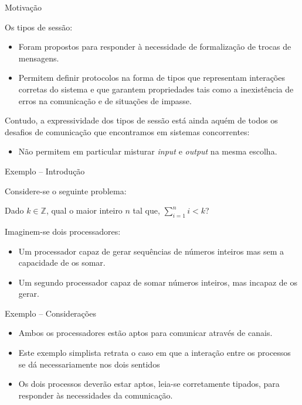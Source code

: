 \lstset{language=freest, numbers=none, escapeinside=||}

\begin{frame}[fragile]{Motivação}

  Os tipos de sessão:
  \begin{itemize}
  \item Foram propostos para responder à necessidade de formalização de trocas de mensagens.
  \item Permitem definir protocolos na forma de tipos que representam interações corretas do sistema e que garantem propriedades tais como a inexistência de erros na comunicação e de situações de impasse.
  \end{itemize}
  Contudo, a expressividade dos tipos de sessão está ainda aquém de todos os desafios de comunicação que encontramos em sistemas concorrentes:
  \begin{itemize}
  \item Não permitem em particular misturar \textit{input} e \textit{output} na mesma escolha.
  \end{itemize}
\end{frame}

\begin{frame}[fragile]{Exemplo -- Introdução}

  Considere-se o seguinte problema:
  
  Dado $k \in \mathbb{Z}$, qual o maior inteiro $n$ tal que, $\sum_{i=1}^{n} i < k$?

  Imaginem-se dois processadores:
  \begin{itemize}
  \item Um processador capaz de gerar sequências de números inteiros mas sem a capacidade de os somar.
  \item Um segundo processador capaz de somar números inteiros, mas incapaz de os gerar.
  \end{itemize}  
\end{frame}

\begin{frame}{Exemplo -- Considerações}
  \begin{itemize}
  \item Ambos os processadores estão aptos para comunicar através de canais.
    \vspace*{2mm}
  \item Este exemplo simplista retrata o caso em que a interação entre os processos se dá necessariamente nos dois sentidos
    \vspace*{5mm}
  \item Os dois processos deverão estar aptos, leia-se corretamente tipados, para responder às necessidades da comunicação.
  \end{itemize}
\end{frame}

